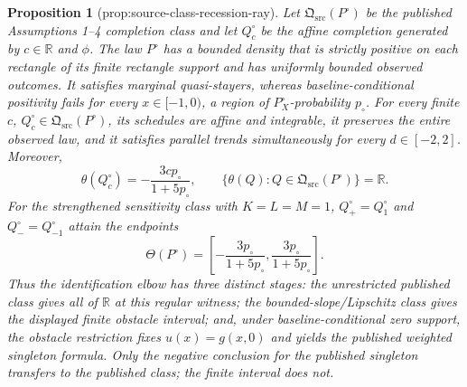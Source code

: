\documentclass{article}
\newtheorem{proposition}{Proposition}
\begin{document}
\begin{proposition}[prop:source-class-recession-ray]\label{prop:source-class-recession-ray}
Let \(\mathfrak Q_{\mathrm{src}}(P^{\circ})\) be the published Assumptions 1--4 completion class and let \(Q_c^{\circ}\) be the affine completion generated by \(c\in\mathbb R\) and \(\phi\). The law \(P^{\circ}\) has a bounded density that is strictly positive on each rectangle of its finite rectangle support and has uniformly bounded observed outcomes. It satisfies marginal quasi-stayers, whereas baseline-conditional positivity fails for every \(x\in[-1,0)\), a region of \(P^{\circ}_X\)-probability \(p_{\circ}\). For every finite \(c\), \(Q_c^{\circ}\in\mathfrak Q_{\mathrm{src}}(P^{\circ})\), its schedules are affine and integrable, it preserves the entire observed law, and it satisfies parallel trends simultaneously for every \(d\in[-2,2]\). Moreover,
\[
\theta(Q_c^{\circ})=-\frac{3c p_{\circ}}{1+5p_{\circ}},
\qquad
\{\theta(Q):Q\in\mathfrak Q_{\mathrm{src}}(P^{\circ})\}=\mathbb R.
\]
For the strengthened sensitivity class with \(K=L=M=1\), \(Q_+^{\circ}=Q_1^{\circ}\) and \(Q_-^{\circ}=Q_{-1}^{\circ}\) attain the endpoints
\[
\Theta(P^{\circ})=
\left[-\frac{3p_{\circ}}{1+5p_{\circ}},
       \frac{3p_{\circ}}{1+5p_{\circ}}\right].
\]
Thus the identification elbow has three distinct stages: the unrestricted published class gives all of \(\mathbb R\) at this regular witness; the bounded-slope/Lipschitz class gives the displayed finite obstacle interval; and, under baseline-conditional zero support, the obstacle restriction fixes \(u(x)=g(x,0)\) and yields the published weighted singleton formula. Only the negative conclusion for the published singleton transfers to the published class; the finite interval does not.
\end{proposition}
\end{document}
